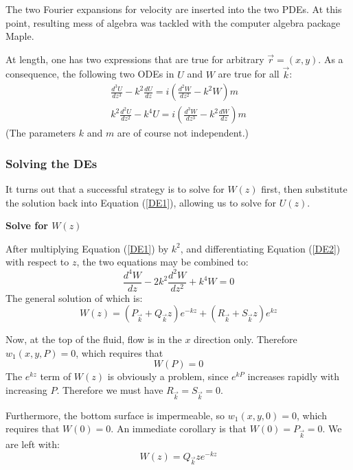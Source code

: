 \documentclass[12pt, a4paper, twoside, openright]{book}
\begin{document}
The two Fourier expansions for velocity are inserted into the two PDEs.  At this point, resulting mess of algebra was tackled with the computer algebra package Maple.

At length, one has two expressions that are true for arbitrary $\vec{r} = (x,y)$.  As a consequence, the following two ODEs in $U$ and $W$ are true for all $\vec{k}$:
\begin{gather}
\frac{d^3 U}{dz^3} - k^2 \frac{d U}{dz} = i \left( \frac{d^2 W}{dz^2} - k^2 W \right) m 
\label{DE1} \\
k^2 \frac{d^2 U}{dz^2} - k^4 U = i \left( \frac{d^3 W}{dz^3} - k^2 \frac{dW}{dz} \right) m
\label{DE2}
\end{gather}
(The parameters $k$ and $m$ are of course not independent.)

\subsubsection*{Solving the DEs}

It turns out that a successful strategy is to solve for $W(z)$ first, then substitute the solution back into Equation (\ref{DE1}), allowing us to solve for $U(z)$.

\vspace{1em}
\textbf{Solve for $W(z)$}

After multiplying Equation (\ref{DE1}) by $k^2$, and  differentiating  Equation (\ref{DE2}) with respect to $z$, the two equations may be combined to:
\begin{equation}
\frac{d^4 W}{dz} - 2 k^2 \frac{d^2 W}{dz^2} + k^4 W = 0
\end{equation}
The general solution of which is:
\begin{equation}
W(z) = \left( P_{\vec{k}} + Q_{\vec{k}} z \right) e^{-kz} +
\left( R_{\vec{k}} + S_{\vec{k}} z \right) e^{kz}
\end{equation}

Now, at the top of the fluid, flow is in the $x$ direction only.  Therefore $w_1(x,y,P) = 0$, which requires that
\begin{equation}
W(P) = 0
\end{equation} 
The $e^{kz}$ term of $W(z)$ is obviously a problem, since $e^{kP}$ increases rapidly with increasing $P$.  Therefore we must have $R_{\vec{k}} = S_{\vec{k}} = 0$.

Furthermore, the bottom surface is impermeable, so $w_1(x,y,0) = 0$, which requires that $W(0) = 0$.  An immediate corollary is that $W(0) = P_{\vec{k}} = 0$.
We are left with:
\begin{equation}
W(z) = Q_{\vec{k}} z e^{-kz}
\end{equation} 
\end{document}
